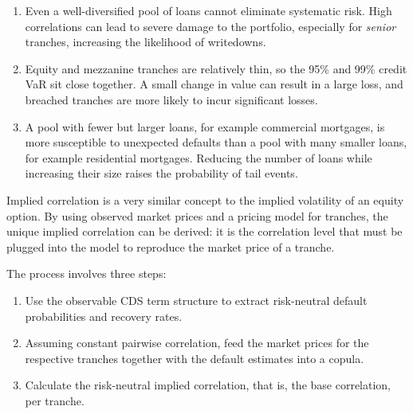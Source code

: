 
\begin{enumerate}
\item {} Even a well-diversified pool of loans cannot
eliminate systematic risk. High correlations can lead to severe damage to the
portfolio, especially for \emph{senior} tranches, increasing the likelihood of
writedowns.
\item {} Equity and mezzanine tranches are relatively thin,
so the 95\% and 99\% credit VaR sit close together. A small change in value can
result in a large loss, and breached tranches are more likely to incur significant
losses.
\item {} A pool with fewer but larger loans, for example
commercial mortgages, is more susceptible to unexpected defaults than a pool with
many smaller loans, for example residential mortgages. Reducing the number of
loans while increasing their size raises the probability of tail events.
\end{enumerate}


\begin{crdefbox}
Implied correlation is a very similar concept to the implied volatility of an
equity option. By using observed market prices and a pricing model for tranches,
the unique implied correlation can be derived: it is the correlation level that
must be plugged into the model to reproduce the market price of a tranche.
\end{crdefbox}

The process involves three steps:

\begin{enumerate}[label=\alph*)]
\item Use the observable CDS term structure to extract risk-neutral default
probabilities and recovery rates.
\item Assuming constant pairwise correlation, feed the market prices for the
respective tranches together with the default estimates into a copula.
\item Calculate the risk-neutral implied correlation, that is, the base
correlation, per tranche.
\end{enumerate}

